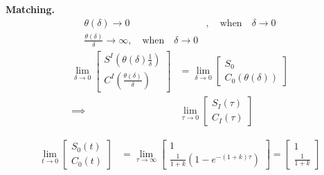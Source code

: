 \documentclass{article}
\theoremstyle{remark}
\begin{document}
\textbf{Matching.} \[
  \begin{split}
\theta \left( \delta  \right) \to  0  & , \quad  \text{when} \quad  \delta \to  0   \\
\frac{\theta \left( \delta  \right)}{ \delta }  \to  \infty , \quad  \text{when} \quad  \delta  \to  0  
  \end{split} 
\] 
\[
  \begin{split}
\lim_{\delta \to 0}  \begin{bmatrix} 
S^{I} \left( \theta \left( \delta  \right) \frac{1}{ \delta }  \right) \\
C^{I} \left( \frac{\theta \left( \delta  \right)}{ \delta }  \right) 
\end{bmatrix} &=   
 \lim_{\delta  \to  0} \begin{bmatrix} 
   S_{0} \\
 C_{0} \left( \theta \left( \delta  \right) \right) 
\end{bmatrix}  \\
\implies   &  \lim_{\tau \to  0} \begin{bmatrix} 
S_{I} \left( \tau  \right) \\
C_{I}\left( \tau  \right)
\end{bmatrix} 
  \end{split} 
\] 


\[
\begin{split}
  \lim_{t\to  0}  \begin{bmatrix} 
  S_{0}\left( t \right) \\
  C_{0} \left( t \right) 
  \end{bmatrix} 
  &=  \lim_{ \tau  \to  \infty}  \begin{bmatrix} 
  1 \\
  \frac{1}{1+ k} \left( 1 - e ^{- \left( 1+ k  \right) \tau } \right)  
  \end{bmatrix} 
  =
  \begin{bmatrix} 
  1 \\
  \frac{1}{1+k}
  \end{bmatrix} 
   \\
\end{split} 
\] 
\end{document}

